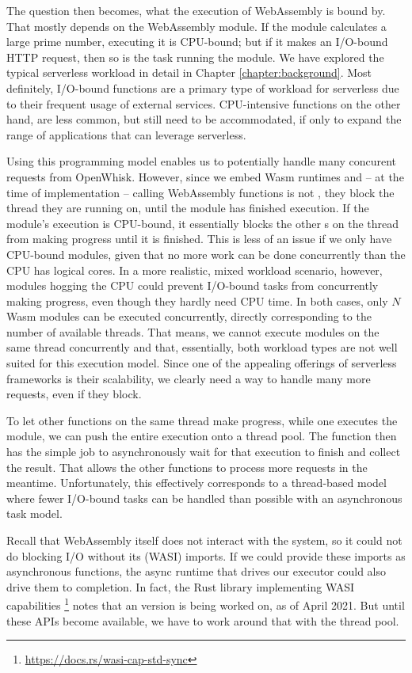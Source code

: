 The question then becomes, what the execution of WebAssembly is bound by. That mostly depends on the WebAssembly module. If the module calculates a large prime number, executing it is CPU-bound; but if it makes an I/O-bound HTTP request, then so is the task running the module. We have explored the typical serverless workload in detail in Chapter \ref{chapter:background}. Most definitely, I/O-bound functions are a primary type of workload for serverless due to their frequent usage of external services. CPU-intensive functions on the other hand, are less common, but still need to be accommodated, if only to expand the range of applications that can leverage serverless.

Using this programming model enables us to potentially handle many concurent requests from OpenWhisk. However, since we embed Wasm runtimes and -- at the time of implementation -- calling WebAssembly functions is not , they block the thread they are running on, until the module has finished execution.
If the module's execution is CPU-bound, it essentially blocks the other s on the thread from making progress until it is finished. This is less of an issue if we only have CPU-bound modules, given that no more work can be done concurrently than the CPU has logical cores. In a more realistic, mixed workload scenario, however, modules hogging the CPU could prevent I/O-bound tasks from concurrently making progress, even though they hardly need CPU time.
In both cases, only $N$ Wasm modules can be executed concurrently, directly corresponding to the number of available threads.
That means, we cannot execute modules on the same thread concurrently and that, essentially, both workload types are not well suited for this execution model.
Since one of the appealing offerings of serverless frameworks is their scalability, we clearly need a way to handle many more requests, even if they block.

To let other  functions on the same thread make progress, while one executes the module, we can push the entire execution onto a thread pool. The function then has the simple job to asynchronously wait for that execution to finish and collect the result. That allows the other functions to process more requests in the meantime. Unfortunately, this effectively corresponds to a thread-based model where fewer I/O-bound tasks can be handled than possible with an asynchronous task model.

Recall that WebAssembly itself does not interact with the system, so it could not do blocking I/O without its (WASI) imports. If we could provide these imports as asynchronous functions, the async runtime that drives our executor could also drive them to completion. In fact, the Rust library implementing WASI capabilities \footnote{\url{https://docs.rs/wasi-cap-std-sync}} notes that an  version is being worked on, as of April 2021. But until these APIs become available, we have to work around that with the thread pool.

